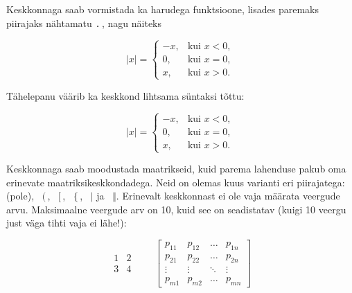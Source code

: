 Keskkonnaga  saab vormistada ka harudega funktsioone, lisades paremaks  piirajaks
nähtamatu \verb|.|\,, nagu näiteks
\begin{example}
\begin{equation*}
  |x| = \left\{
    \begin{array}{rl}
      -x, & \text{kui } x < 0,\\
      0, & \text{kui } x = 0,\\
      x, & \text{kui } x > 0.
    \end{array} \right.
\end{equation*}
\end{example}
\noindent
Tähelepanu väärib ka keskkond  lihtsama süntaksi tõttu:
\begin{example}
  \begin{equation*}
    |x| =
    \begin{cases}
      -x, & \text{kui } x < 0,\\
      0, & \text{kui } x = 0,\\
      x, & \text{kui } x > 0.
    \end{cases}
\end{equation*}
\end{example}

Keskkonnaga  saab moodustada maatrikseid, kuid
parema lahenduse pakub  oma erinevate
maatriksikeskkondadega. Neid on olemas kuus varianti eri piirajatega:
 (pole), ~$($\,, ~$[$\,,
~$\{$\,, ~$\vert$ ja ~$\Vert$.
Erinevalt keskkonnast  ei ole vaja määrata veergude arvu.
Maksimaalne veergude arv on 10, kuid see on seadistatav (kuigi 10 veergu
just väga tihti vaja ei lähe!):
\begin{example}
\begin{equation*}
  \begin{matrix}
    1 & 2 \\
    3 & 4
  \end{matrix} \qquad
  \begin{bmatrix}
    p_{11} & p_{12} & \ldots
    & p_{1n} \\
    p_{21} & p_{22} & \ldots
    & p_{2n} \\
    \vdots & \vdots & \ddots
    & \vdots \\
    p_{m1} & p_{m2} & \ldots
    & p_{mn}
  \end{bmatrix}
\end{equation*}
\end{example}

